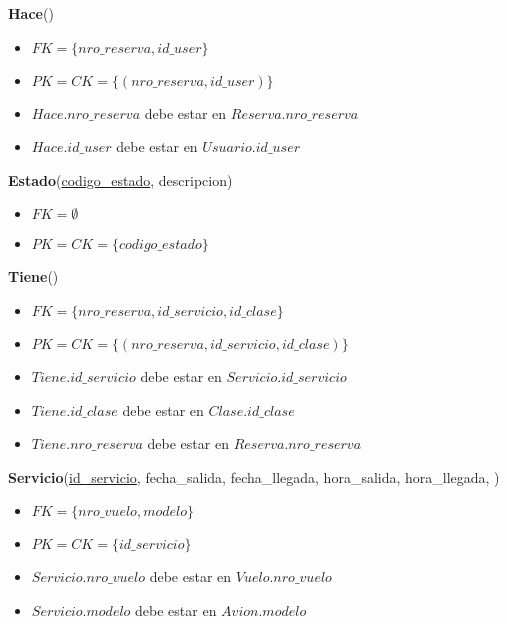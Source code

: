\newpage
\vspace*{0.1cm}
\noindent
\textbf{Hace}(\underline{})
\begin{itemize}[noitemsep]
	\item $FK = \{nro\_reserva, id\_user\}$
	\item $PK = CK = \{(nro\_reserva, id\_user)\}$
	\item $Hace.nro\_reserva$ debe estar en $Reserva.nro\_reserva$
	\item $Hace.id\_user$ debe estar en $Usuario.id\_user$
\end{itemize}

\vspace*{0.1cm}
\noindent
\textbf{Estado}(\underline{codigo\_estado}, descripcion)
\begin{itemize}[noitemsep]
	\item $FK = \emptyset$
	\item $PK = CK = \{codigo\_estado\}$
\end{itemize}

\vspace*{0.1cm}
\noindent
\textbf{Tiene}(\underline{})
\begin{itemize}[noitemsep]
	\item $FK = \{nro\_reserva, id\_servicio, id\_clase\}$
	\item $PK = CK = \{(nro\_reserva, id\_servicio, id\_clase)\}$
	\item $Tiene.id\_servicio$ debe estar en $Servicio.id\_servicio$
	\item $Tiene.id\_clase$ debe estar en $Clase.id\_clase$
	\item $Tiene.nro\_reserva$ debe estar en $Reserva.nro\_reserva$
\end{itemize}

\vspace*{0.1cm}
\noindent
\textbf{Servicio}(\underline{id\_servicio}, fecha\_salida, fecha\_llegada,
		hora\_salida, hora\_llegada, )
\begin{itemize}[noitemsep]
	\item $FK = \{nro\_vuelo, modelo\}$
	\item $PK = CK = \{id\_servicio\}$
	\item $Servicio.nro\_vuelo$ debe estar en $Vuelo.nro\_vuelo$
	\item $Servicio.modelo$ debe estar en $Avion.modelo$
\end{itemize}

